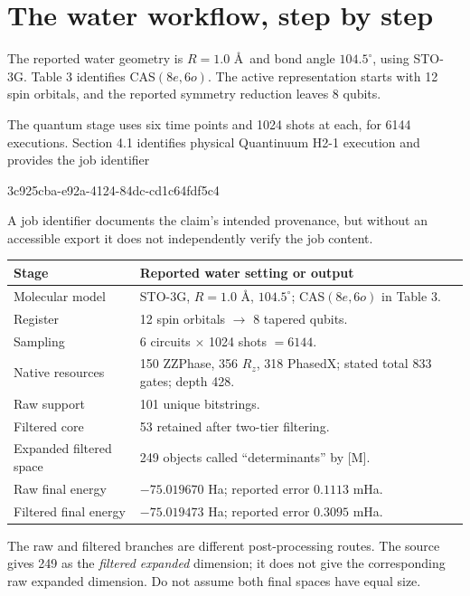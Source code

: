 \documentclass[11pt,a4paper,oneside]{report}
\begin{document}
\section{The water workflow, step by step}
The reported water geometry is $R=1.0$ \AA\ and bond angle $104.5^\circ$, using STO-3G. Table 3 identifies CAS$(8e,6o)$. The active representation starts with 12 spin orbitals, and the reported symmetry reduction leaves 8 qubits.

The quantum stage uses six time points and 1024 shots at each, for 6144 executions. Section 4.1 identifies physical Quantinuum H2-1 execution and provides the job identifier
\begin{center}\small\ttfamily 3c925cba-e92a-4124-84dc-cd1c64fdf5c4\end{center}
A job identifier documents the claim's intended provenance, but without an accessible export it does not independently verify the job content.

\begin{center}
\begin{tabularx}{\linewidth}{@{}p{44mm}Y@{}}
\toprule Stage & Reported water setting or output\\\midrule
Molecular model & STO-3G, $R=1.0$ \AA, $104.5^\circ$; CAS$(8e,6o)$ in Table 3.\\
Register & 12 spin orbitals $\to$ 8 tapered qubits.\\
Sampling & 6 circuits $\times$ 1024 shots $=6144$.\\
Native resources & 150 ZZPhase, 356 $R_z$, 318 PhasedX; stated total 833 gates; depth 428.\\
Raw support & 101 unique bitstrings.\\
Filtered core & 53 retained after two-tier filtering.\\
Expanded filtered space & 249 objects called ``determinants'' by [M].\\
Raw final energy & $-75.019670$ Ha; reported error $0.1113$ mHa.\\
Filtered final energy & $-75.019473$ Ha; reported error $0.3095$ mHa.\\\bottomrule
\end{tabularx}
\end{center}

The raw and filtered branches are different post-processing routes. The source gives 249 as the \emph{filtered expanded} dimension; it does not give the corresponding raw expanded dimension. Do not assume both final spaces have equal size.
\end{document}

